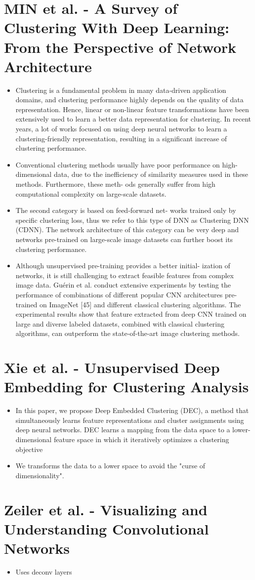 \documentclass{report}
\begin{document}
\section*{MIN et al. - A Survey of Clustering With Deep Learning: From
the Perspective of Network Architecture}
\begin{itemize}
    \item Clustering is a fundamental problem in many data-driven application domains, and clustering
    performance highly depends on the quality of data representation. Hence, linear or non-linear feature
    transformations have been extensively used to learn a better data representation for clustering. In recent years,
    a lot of works focused on using deep neural networks to learn a clustering-friendly representation, resulting
    in a significant increase of clustering performance.
    \item Conventional clustering methods usually have poor performance on high-dimensional data, due to the inefficiency of similarity
    measures used in these methods. Furthermore, these meth-
    ods generally suffer from high computational complexity on
    large-scale datasets.
    \item The second category is based on feed-forward net-
    works trained only by specific clustering loss, thus we refer to
    this type of DNN as Clustering DNN (CDNN). The network
    architecture of this category can be very deep and networks
    pre-trained on large-scale image datasets can further boost
    its clustering performance.
    \item Although unsupervised pre-training provides a better initial-
    ization of networks, it is still challenging to extract feasible
    features from complex image data. Guérin et al. conduct extensive experiments by testing the performance of combinations of different popular CNN architectures pre-trained on ImageNet [45] and different classical clustering algorithms. The experimental results show that feature extracted from deep CNN trained on large and diverse labeled datasets, combined with classical clustering algorithms, can outperform the state-of-the-art image clustering methods.
\end{itemize}

\section*{Xie et al. - Unsupervised Deep Embedding for Clustering Analysis}
\begin{itemize}
    \item In this paper, we propose Deep Embedded Clustering (DEC), a method that simultaneously learns feature representations and cluster assignments using deep neural networks. DEC learns a mapping from the data space to a lower-dimensional feature space in which it iteratively optimizes a clustering objective
    \item We transforms the data to a lower space to avoid the "curse of dimensionality". 
\end{itemize}

\section*{Zeiler et al. - Visualizing and Understanding Convolutional Networks}

\begin{itemize}
    \item Uses deconv layers
\end{itemize}
\end{document}
